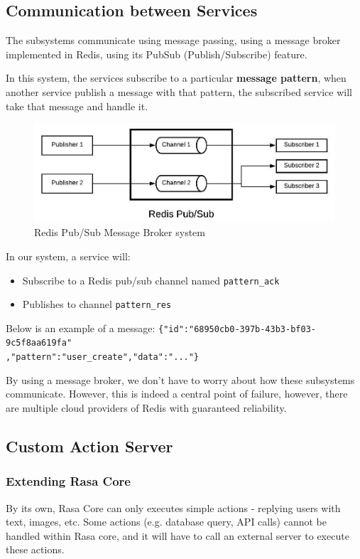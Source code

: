 \subsection{Communication between Services}
The subsystems communicate using message passing, using a message broker implemented in Redis, using its PubSub (Publish/Subscribe) feature.

In this system, the services subscribe to a particular \textbf{message pattern}, when another service publish a message with that pattern, the subscribed service will take that message and handle it.

\begin{figure}[!h]
	\centering
	\includegraphics[scale=1]{Picture/architecture/redis-pub-sub.jpeg}
	\caption{Redis Pub/Sub Message Broker system}
\label{fig:pubsub}
\end{figure}

In our system, a service will:
\begin{itemize}
    \item Subscribe to a Redis pub/sub channel named \texttt{pattern\_ack}
    \item Publishes to channel \texttt{pattern\_res}
\end{itemize}

Below is an example of a message:
\texttt{\{"id":"68950cb0-397b-43b3-bf03-9c5f8aa619fa"\\,"pattern":"user\_create","data":"..."\}}

By using a message broker, we don't have to worry about how these subsystems communicate. However, this is indeed a central point of failure, however, there are multiple cloud providers of Redis with guaranteed reliability.

\subsection{Custom Action Server}
\subsubsection{Extending Rasa Core}
By its own, Rasa Core can only executes simple actions - replying users with text, images, etc. Some actions (e.g. database query, API calls) cannot be handled within Rasa core, and it will have to call an external server to execute these actions.

